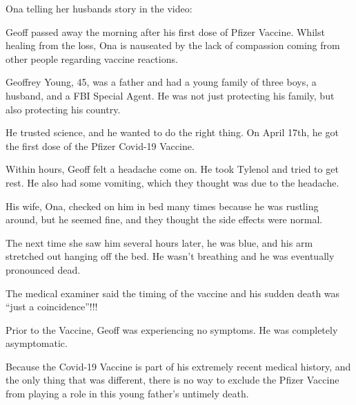 Ona telling her husbands story in the video:

Geoff passed away the morning after his first dose of Pfizer Vaccine. Whilst
healing from the loss, Ona is nauseated by the lack of compassion coming from
other people regarding vaccine reactions.

Geoffrey Young, 45, was a father and had a young family of three boys, a
husband, and a FBI Special Agent. He was not just protecting his family, but
also protecting his country.

He trusted science, and he wanted to do the right thing. On April 17th, he got
the first dose of the Pfizer Covid-19 Vaccine.

Within hours, Geoff felt a headache come on. He took Tylenol and tried to get
rest. He also had some vomiting, which they thought was due to the headache.

His wife, Ona, checked on him in bed many times because he was rustling around,
but he seemed fine, and they thought the side effects were normal.

The next time she saw him several hours later, he was blue, and his arm
stretched out hanging off the bed. He wasn’t breathing and he was eventually
pronounced dead.

The medical examiner said the timing of the vaccine and his sudden death was
“just a coincidence”!!!

Prior to the Vaccine, Geoff was experiencing no symptoms. He was completely
asymptomatic.

Because the Covid-19 Vaccine is part of his extremely recent medical history,
and the only thing that was different, there is no way to exclude the Pfizer
Vaccine from playing a role in this young father’s untimely death.

